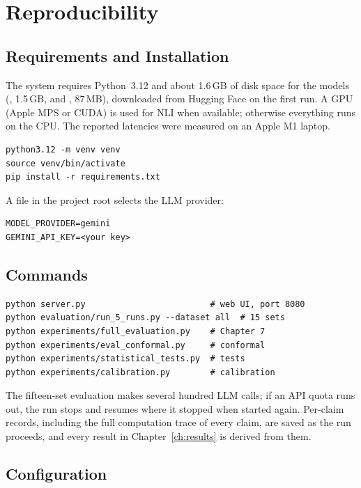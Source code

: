 \chapter{Reproducibility}
\label{app:repro}

\section{Requirements and Installation}

The system requires Python~3.12 and about 1.6\,GB of disk space for the models (, 1.5\,GB, and , 87\,MB), downloaded from Hugging Face on the first run. A GPU (Apple MPS or CUDA) is used for NLI when available; otherwise everything runs on the CPU. The reported latencies were measured on an Apple M1 laptop.

\begin{verbatim}
python3.12 -m venv venv
source venv/bin/activate
pip install -r requirements.txt
\end{verbatim}

A  file in the project root selects the LLM provider:
\begin{verbatim}
MODEL_PROVIDER=gemini
GEMINI_API_KEY=<your key>
\end{verbatim}

\section{Commands}

\begin{verbatim}
python server.py                         # web UI, port 8080
python evaluation/run_5_runs.py --dataset all  # 15 sets
python experiments/full_evaluation.py    # Chapter 7
python experiments/eval_conformal.py     # conformal
python experiments/statistical_tests.py  # tests
python experiments/calibration.py        # calibration
\end{verbatim}

The fifteen-set evaluation makes several hundred LLM calls; if an API quota runs out, the run stops and resumes where it stopped when started again. Per-claim records, including the full computation trace of every claim, are saved as the run proceeds, and every result in Chapter~\ref{ch:results} is derived from them.

\section{Configuration}

